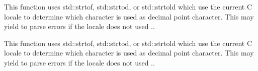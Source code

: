 
\begin{DoxyRefList}
\item[\label{bug__bug000001}%
\hypertarget{bug__bug000001}{}%
Global \hyperlink{classnlohmann_1_1basic__json_1_1lexer_a541f1cd06178fefc5ddde34022852c10_a541f1cd06178fefc5ddde34022852c10}{nlohmann\-:\-:basic\-\_\-json$<$ Object\-Type, Array\-Type, String\-Type, Boolean\-Type, Number\-Integer\-Type, Number\-Unsigned\-Type, Number\-Float\-Type, Allocator\-Type $>$\-:\-:lexer\-:\-:str\-\_\-to\-\_\-float\-\_\-t} (long double $\ast$, char $\ast$$\ast$endptr) const ]This function uses {\ttfamily std\-::strtof}, {\ttfamily std\-::strtod}, or {\ttfamily std\-::strtold} which use the current C locale to determine which character is used as decimal point character. This may yield to parse errors if the locale does not used {\ttfamily .}. 

This function uses {\ttfamily std\-::strtof}, {\ttfamily std\-::strtod}, or {\ttfamily std\-::strtold} which use the current C locale to determine which character is used as decimal point character. This may yield to parse errors if the locale does not used {\ttfamily .}. 
\end{DoxyRefList}